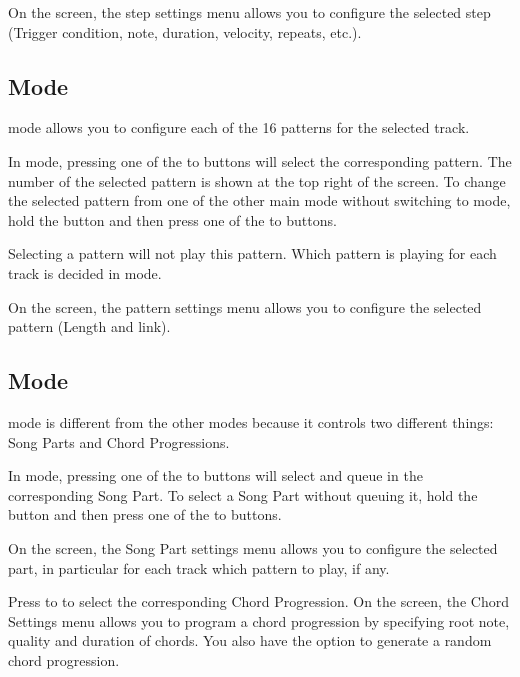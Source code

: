\documentclass[8pt]{extarticle}
\begin{document}
\begin{multicols*}{3}
On the screen, the step settings menu allows you to configure the selected step (Trigger condition, note, duration, velocity, repeats, etc.).

\subsection{ Mode}

 mode allows you to configure each of the 16 patterns for the selected track. 

In  mode, pressing one of the  to  buttons will select the corresponding pattern. The number of the selected pattern is shown at the top right of the screen.
To change the selected pattern from one of the other main mode without switching to  mode, hold the  button and then press one of the  to  buttons.

\begin{important}
    Selecting a pattern will not play this pattern.
    Which pattern is playing for each track is decided in  mode.
\end{important}

On the screen, the pattern settings menu allows you to configure the selected pattern (Length and link).

\subsection{ Mode}

 mode is different from the other modes because it controls two different things: Song Parts and Chord Progressions. 

In  mode, pressing one of the  to  buttons will select and queue in the corresponding Song Part. To select a Song Part without queuing it, hold the  button and then press one of the  to  buttons.

On the screen, the Song Part settings menu allows you to configure the selected part, in particular for each track which pattern to play, if any.

Press  to  to select the corresponding Chord Progression. On the screen, the Chord Settings menu allows you to program a chord progression by specifying root note, quality and duration of chords. You also have the option to generate a random chord progression.


\end{multicols*}
\end{document}
